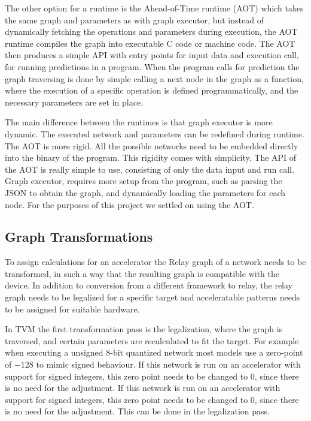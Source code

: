 \documentclass[12pt,a4paper,english
]{tunithesis}
\begin{document}
The other option for a runtime is the Ahead-of-Time runtime (AOT) which takes the same graph and parameters as with graph executor, but instead of dynamically fetching the operations and parameters during execution, the AOT runtime compiles the graph into executable C code or machine code. The AOT then produces a simple API with entry points for input data and execution call, for running predictions in a program. When the program calls for prediction the graph traversing is done by simple calling a next node in the graph as a function, where the execution of a specific operation is defined programmatically, and the necessary parameters are set in place.

The main difference between the runtimes is that graph executor is more dynamic. The executed network and parameters can be redefined during runtime. The AOT is more rigid. All the possible networks need to be embedded directly into the binary of the program. This rigidity comes with simplicity. The API of the AOT is really simple to use, consisting of only the data input and run call. Graph executor, requires more setup from the program, such as parsing the JSON to obtain the graph, and dynamically loading the parameters for each node. For the purposes of this project we settled on using the AOT.

\subsection{Graph Transformations}
To assign calculations for an accelerator the Relay graph of a network needs to be transformed, in such a way that the resulting graph is compatible with the device. In addition to conversion from a different framework to relay, the relay graph needs to be legalized for a specific target and acceleratable patterns needs to be assigned for suitable hardware.

In TVM the first transformation pass is the legalization, where the graph is traversed, and certain parameters are recalculated to fit the target. For example when executing a unsigned 8-bit quantized network most models use a zero-point of $-128$ to mimic signed behaviour. If this network is run on an accelerator with support for signed integers, this zero point needs to be changed to 0, since there is no need for the adjustment. If this network is run on an accelerator with support for signed integers, this zero point needs to be changed to 0, since there is no need for the adjustment. This can be done in the legalization pass.
\end{document}
